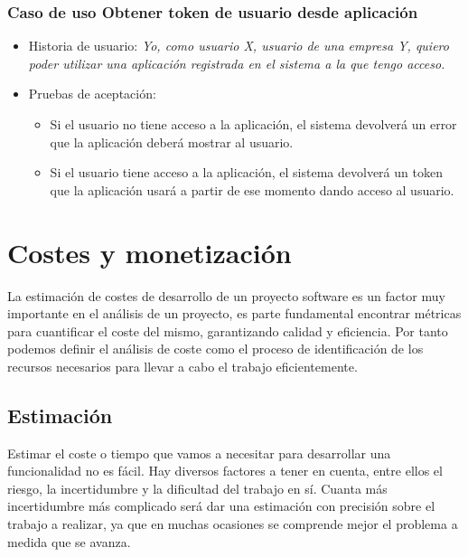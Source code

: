 \documentclass[12pt,a4paperpaper,]{report}
\providecommand{\tightlist}{%
  \setlength{\itemsep}{0pt}\setlength{\parskip}{0pt}}
\begin{document}
\subsection{Caso de uso Obtener token de usuario desde
aplicación}\label{caso-de-uso-obtener-token-de-usuario-desde-aplicaciuxf3n}

\begin{itemize}
\tightlist
\item
  Historia de usuario: \emph{Yo, como usuario X, usuario de una empresa
  Y, quiero poder utilizar una aplicación registrada en el sistema a la
  que tengo acceso.}
\item
  Pruebas de aceptación:

  \begin{itemize}
  \tightlist
  \item
    Si el usuario no tiene acceso a la aplicación, el sistema devolverá
    un error que la aplicación deberá mostrar al usuario.
  \item
    Si el usuario tiene acceso a la aplicación, el sistema devolverá un
    token que la aplicación usará a partir de ese momento dando acceso
    al usuario.
  \end{itemize}
\end{itemize}

\chapter{Costes y monetización}\label{costes-y-monetizaciuxf3n}

La estimación de costes de desarrollo de un proyecto software es un
factor muy importante en el análisis de un proyecto, es parte
fundamental encontrar métricas para cuantificar el coste del mismo,
garantizando calidad y eficiencia. Por tanto podemos definir el análisis
de coste como el proceso de identificación de los recursos necesarios
para llevar a cabo el trabajo eficientemente.

\section{Estimación}\label{estimaciuxf3n}

Estimar el coste o tiempo que vamos a necesitar para desarrollar una
funcionalidad no es fácil. Hay diversos factores a tener en cuenta,
entre ellos el riesgo, la incertidumbre y la dificultad del trabajo en
sí. Cuanta más incertidumbre más complicado será dar una estimación con
precisión sobre el trabajo a realizar, ya que en muchas ocasiones se
comprende mejor el problema a medida que se avanza.
\end{document}
